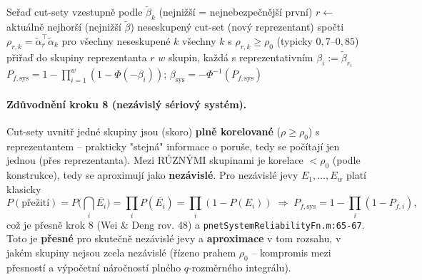 \documentclass[11pt,a4paper]{article}
\newcommand{\code}[1]{\texttt{#1}}
\begin{document}
\begin{algorithm}[h]
\caption{PNET seskupení a kombinace}
\begin{algorithmic}[1]
\State Seřaď cut-sety vzestupně podle $\tilde\beta_k$ (nejnižší = nejnebezpečnější první)
  \State $r \gets$ aktuálně nejhorší (nejnižší $\tilde\beta$) neseskupený cut-set (nový reprezentant)
  \State spočti $\rho_{r,k} = \tilde\alpha_r^\top\tilde\alpha_k$ pro všechny neseskupené $k$
  \State všechny $k$ s $\rho_{r,k}\ge \rho_0$ (typicky $0{,}7$--$0{,}85$) přiřaď do skupiny reprezentanta $r$
\EndWhile
\State $w$ skupin, každá s reprezentativním $\beta_i := \tilde\beta_{r_i}$
\State $P_{f,\mathrm{sys}} = 1-\prod_{i=1}^w(1-\Phi(-\beta_i))$; \quad $\beta_{\mathrm{sys}}=-\Phi^{-1}(P_{f,\mathrm{sys}})$
\end{algorithmic}
\end{algorithm}

\paragraph{Zdůvodnění kroku 8 (nezávislý sériový systém).} Cut-sety uvnitř jedné skupiny jsou (skoro)
\textbf{plně korelované} ($\rho\ge\rho_0$) s reprezentantem -- prakticky "stejná" informace o poruše,
tedy se počítají jen jednou (přes reprezentanta). Mezi RŮZNÝMI skupinami je korelace $<\rho_0$ (podle
konstrukce), tedy se aproximují jako \textbf{nezávislé}. Pro nezávislé jevy $E_1,\dots,E_w$ platí
klasicky
\[
  P(\text{přežití}) = P\Big(\bigcap_i \overline{E_i}\Big) = \prod_i P(\overline{E_i}) = \prod_i(1-P(E_i))
  \;\Longrightarrow\; P_{f,\mathrm{sys}} = 1-\prod_i(1-P_{f,i}),
\tag{C.9}
\]
což je přesně krok 8 (Wei \& Deng rov. 48) a \code{pnetSystemReliabilityFn.m:65-67}. Toto je
\textbf{přesné} pro skutečně nezávislé jevy a \textbf{aproximace} v tom rozsahu, v jakém
skupiny nejsou zcela nezávislé (řízeno prahem $\rho_0$ -- kompromis mezi přesností a výpočetní
náročností plného $q$-rozměrného integrálu).
\end{document}
